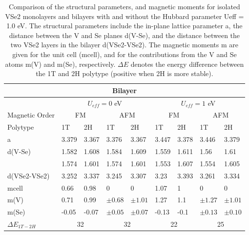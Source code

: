 \documentclass[reprint, aps, prb, showkeys]{revtex4-2}
\begin{document}
\begin{table*}[]
    \caption{\label{table:PhysRevB.96.235147_Hubbard-U_Bilayer} 
    Comparison of the structural parameters, and magnetic moments for isolated VSe2 monolayers and bilayers with and without the Hubbard parameter Ueff = 1.0 eV. The structural parameters include the in-plane lattice parameter a, the distance between the V and Se planes d(V-Se), and the distance between the two VSe2 layers in the bilayer d(VSe2-VSe2). The magnetic moments m are given for the unit cell (mcell), and for the contributions from the V and Se atoms m(V) and m(Se), respectively. $\Delta E$ denotes the energy difference between the 1T and 2H polytype (positive when 2H is more stable).
    }
    \begin{ruledtabular}
        \begin{tabular}{lllllllll}
            \multicolumn{9}{c}{Bilayer}                                                                      \\
            \hline
                         & \multicolumn{4}{c}{$U_{eff} = 0 $ eV}   & \multicolumn{4}{c}{$U_{eff} = 1 $ eV}   \\
            Magnetic Order     & \multicolumn{2}{c}{FM} & \multicolumn{2}{c}{AFM} & \multicolumn{2}{c}{FM} & \multicolumn{2}{c}{AFM} \\
            Polytype     & 1T    & 2H    & 1T         & 2H         & 1T    & 2H    & 1T         & 2H         \\
            \hline
            a            & 3.379 & 3.367 & 3.376      & 3.367      & 3.447 & 3.378 & 3.446      & 3.379      \\
            d(V-Se)      & 1.582 & 1.608 & 1.584      & 1.609      & 1.559 & 1.611 & 1.56       & 1.61       \\
                         & 1.574 & 1.601 & 1.574      & 1.601      & 1.553 & 1.607 & 1.554      & 1.605      \\
            d(VSe2-VSe2) & 3.252 & 3.337 & 3.245      & 3.307      & 3.23  & 3.393 & 3.261      & 3.334      \\
            mcell        & 0.66  & 0.98  & 0          & 0          & 1.07  & 1     & 0          & 0          \\
            m(V)         & 0.71  & 0.99  & $\pm 0.68$ & $\pm 1.01$ & 1.27  & 1.1   & $\pm 1.27$ & $\pm 1.01$ \\
            m(Se)              & -0.05      & -0.07     & $\pm 0.05$ & $\pm 0.07$ & -0.13      & -0.1      & $\pm 0.13$ & $\pm 0.10$ \\
            $\Delta E_{1T-2H}$ & \multicolumn{2}{c}{32} & \multicolumn{2}{c}{32}  & \multicolumn{2}{c}{22} & \multicolumn{2}{c}{25} 
            \end{tabular}
    \end{ruledtabular}
\end{table*}
\end{document}
